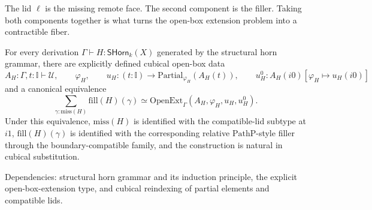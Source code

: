 \documentclass{lmcs}
\begin{document}
The lid \(\ell\) is the missing remote face.  The second component is the filler.  Taking
both components together is what turns the open-box extension problem into a contractible
fiber.

\begin{lem}
\label{lem:horn-open-box}
For every derivation \(\Gamma\vdash H:\mathsf{SHorn}_k(X)\) generated by the structural horn
grammar, there are explicitly defined cubical open-box data
\[
  A_H:\Gamma,t:\mathbb I\vdash\mathcal U,\qquad
  \varphi_H,\qquad
  u_H:(t:\mathbb I)\to\mathrm{Partial}_{\varphi_H}(A_H(t)),\qquad
  u^0_H:A_H(i0)[\varphi_H\mapsto u_H(i0)]
\]
and a canonical equivalence
\[
  \sum_{\gamma:\mathrm{miss}(H)}\mathrm{fill}(H)(\gamma)
  \simeq
  \mathrm{OpenExt}_{\Gamma}(A_H,\varphi_H,u_H,u^0_H).
\]
Under this equivalence, \(\mathrm{miss}(H)\) is identified with the compatible-lid subtype at
\(i1\), \(\mathrm{fill}(H)(\gamma)\) is identified with the corresponding relative
\(\mathrm{PathP}\)-style filler through the boundary-compatible family, and the construction
is natural in cubical substitution.

Dependencies: structural horn grammar and its induction principle, the explicit
open-box-extension type, and cubical reindexing of partial elements and compatible lids.
\end{lem}
\end{document}
